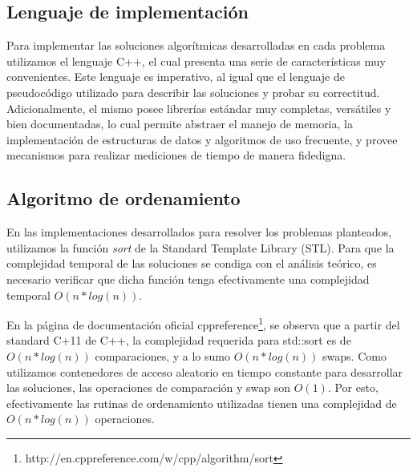\subsection{Lenguaje de implementación}

Para implementar las soluciones algorítmicas desarrolladas en cada problema utilizamos el lenguaje C++, el cual presenta una serie de características muy convenientes. Este lenguaje es imperativo, al igual que el lenguaje de pseudocódigo utilizado para describir las soluciones y probar su correctitud. Adicionalmente, el mismo posee librerías estándar muy completas, versátiles y bien documentadas, lo cual permite abstraer el manejo de memoria, la implementación de estructuras de datos y algoritmos de uso frecuente, y provee mecanismos para realizar mediciones de tiempo de manera fidedigna.

\subsection{Algoritmo de ordenamiento}

En las implementaciones desarrollados para resolver los problemas planteados, utilizamos la función \emph{sort} de la Standard Template Library (STL). Para que la complejidad temporal de las soluciones se condiga con el análisis teórico, es necesario verificar que dicha función tenga efectivamente una complejidad temporal $O(n * log(n))$.

En la página de documentación oficial cppreference\footnote{http://en.cppreference.com/w/cpp/algorithm/sort}, se observa que a partir del standard C+11 de C++, la complejidad requerida para std::sort es de $O(n*log (n))$ 
comparaciones, y a lo sumo $O(n * log(n))$ swaps. Como utilizamos contenedores de acceso aleatorio en tiempo constante para desarrollar las soluciones, las operaciones de comparación y swap son $O(1)$. Por esto, efectivamente las rutinas de ordenamiento utilizadas tienen una complejidad de $O(n * log(n))$ operaciones.



